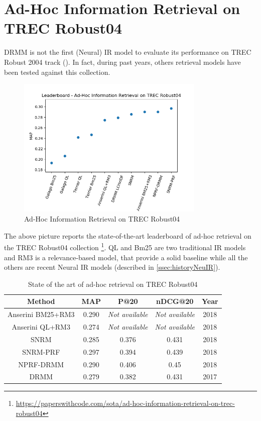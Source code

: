 \section{Ad-Hoc Information Retrieval on TREC Robust04}
\label{sec:leaderboadrobust04}

DRMM is not the first (Neural) IR model to evaluate its performance on TREC Robust 2004 track (\cite{rob04}). In fact, during past years, others retrieval models have been tested against this collection.

\begin{figure}[H]
  \centering
  \includegraphics[width=0.8\textwidth]{res/img/EvalRobust04.png}
  \caption{Ad-Hoc Information Retrieval on TREC Robust04}
  \label{fig:evalRob04}
\end{figure}

The above picture reports the state-of-the-art leaderboard of ad-hoc retrieval on the TREC Robust04 collection \footnote{\url{https://paperswithcode.com/sota/ad-hoc-information-retrieval-on-trec-robust04}}.
QL and Bm25 are two traditional IR models and RM3 is a relevance-based model, that provide a solid baseline while all the others are recent Neural IR models (described in \ref{ssec:historyNeuIR}).

\begin{table}[H]
\centering
\begin{tabular}{ccccc}
\textbf{Method} & \textbf{MAP} & \textbf{P@20} & \textbf{nDCG@20} & \textbf{Year} \\ \hline
Anserini BM25+RM3 & 0.290 & \textit{Not available} & \textit{Not available} & 2018 \\ \hline
Anserini QL+RM3 & 0.274 & \textit{Not available} & \textit{Not available} & 2018 \\ \hline
SNRM & 0.285 & 0.376 & 0.431 & 2018 \\ \hline
SNRM-PRF & 0.297 & 0.394 & 0.439 & 2018 \\ \hline
NPRF-DRMM & 0.290 & 0.406 & 0.45 & 2018 \\ \hline
DRMM & 0.279 & 0.382 & 0.431 & 2017 \\ \hline
\end{tabular}
\caption{State of the art of ad-hoc retrieval on TREC Robust04}
\label{table:leaderboardRob04}
\end{table}


